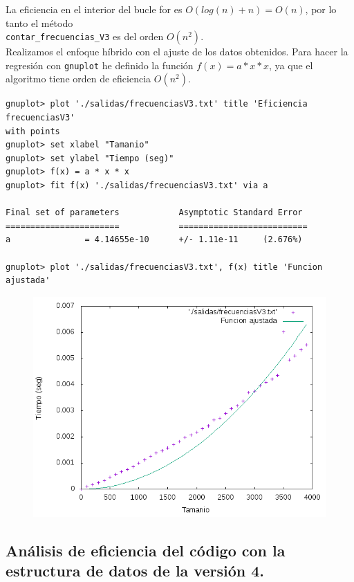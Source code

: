 \documentclass[11pt]{article}
\begin{document}
La eficiencia en el interior del bucle for es $O(log (n) + n) = O(n)$, por lo tanto el método\\ \texttt{contar\_frecuencias\_V3} es del orden $O(n^2)$.\\

Realizamos el enfoque híbrido con el ajuste de los datos obtenidos. Para hacer la regresión con \texttt{gnuplot} he definido la función $f(x) = a * x * x$, ya que el algoritmo tiene orden de eficiencia $O(n^2)$.

\begin{verbatim}
gnuplot> plot './salidas/frecuenciasV3.txt' title 'Eficiencia frecuenciasV3' 
with points
gnuplot> set xlabel "Tamanio"
gnuplot> set ylabel "Tiempo (seg)"
gnuplot> f(x) = a * x * x
gnuplot> fit f(x) './salidas/frecuenciasV3.txt' via a

Final set of parameters            Asymptotic Standard Error
=======================            ==========================
a               = 4.14655e-10      +/- 1.11e-11     (2.676%)

gnuplot> plot './salidas/frecuenciasV3.txt', f(x) title 'Funcion ajustada'
\end{verbatim}

\begin{figure}[H]
\begin{center}
\includegraphics[width=12cm]{../salidas/frecuenciasV3.png}
\end{center}
\end{figure}

\subsection{Análisis de eficiencia del código con la estructura de datos de la versión 4.}
\end{document}
